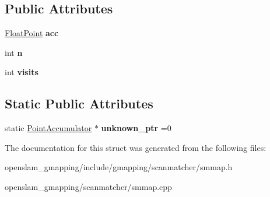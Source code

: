 \subsection*{Public Attributes}
\begin{DoxyCompactItemize}
\item 
\mbox{\label{structGMapping_1_1PointAccumulator_afe87f0be8d1e6fc22fa3b1cd071fccbc}} 
\hyperlink{structGMapping_1_1point}{Float\+Point} {\bfseries acc}
\item 
\mbox{\label{structGMapping_1_1PointAccumulator_a0f8ef48ef8f7ffb3a032fae2b8894a59}} 
int {\bfseries n}
\item 
\mbox{\label{structGMapping_1_1PointAccumulator_ac0f05215ef622a21313b219015ae5de1}} 
int {\bfseries visits}
\end{DoxyCompactItemize}
\subsection*{Static Public Attributes}
\begin{DoxyCompactItemize}
\item 
\mbox{\label{structGMapping_1_1PointAccumulator_a56ae0e815f9b340e4e2a483bd7f6704d}} 
static \hyperlink{structGMapping_1_1PointAccumulator}{Point\+Accumulator} $\ast$ {\bfseries unknown\+\_\+ptr} =0
\end{DoxyCompactItemize}


The documentation for this struct was generated from the following files\+:\begin{DoxyCompactItemize}
\item 
openslam\+\_\+gmapping/include/gmapping/scanmatcher/smmap.\+h\item 
openslam\+\_\+gmapping/scanmatcher/smmap.\+cpp\end{DoxyCompactItemize}
